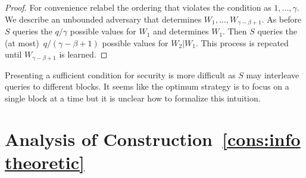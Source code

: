 \documentclass[11pt]{article}
\newcommand{\consref}[1]{\mbox{Construction~\ref{#1}}}
\begin{document}
\begin{proof}
For convenience relabel the ordering that violates the condition as $1,..., \gamma$.  We describe an unbounded adversary that determines $W_1,..., W_{\gamma-\beta+1}$.  As before $S$ queries the $q /\gamma$ possible values for $W_1$ and determines $W_1$.  Then $S$ queries the (at most)~$q/(\gamma-\beta+1)$ possible values for $W_2 | W_1$.  This process is repeated until $W_{\gamma-\beta+1}$ is learned.
\end{proof}

Presenting a sufficient condition for security is more difficult as $S$ may interleave queries to different blocks.  It seems like the optimum strategy is to focus on a single block at a time but it is unclear how to formalize this intuition.

\section{Analysis of \consref{cons:info theoretic}}
\label{sec:info theory sec}
\end{document}
